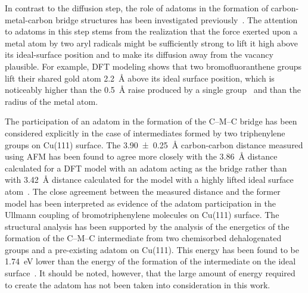 \documentclass[%
 reprint,
 amsmath,amssymb,
 aps,
prb,
floatfix,
]{revtex4-2}
\newcommand{\lock}{\color{red}}
\newcommand{\lock}{\color{red}}
\newcommand{\comm}{\color{Purple}} %
\begin{document}
{\lock

In contrast to the diffusion step, the role of adatoms in the formation of carbon-metal-carbon bridge structures has been investigated previously~\cite{acsnano2017, acsnano2019}. %
The attention to adatoms in this step stems from the realization that the force exerted upon a metal atom by two aryl radicals might be sufficiently strong to lift it high above its ideal-surface position and to make its diffusion away from the vacancy plausible. 
For example, DFT modeling shows that two bromofluoranthene groups lift their shared gold atom \SI{2.2}{\angstrom} above its ideal surface position, which is noticeably higher than the \SI{0.5}{\angstrom} raise produced by a single group~\cite{jpcc2018} and than the radius of the metal atom.

The participation of an adatom in the formation of the C--M--C bridge has been considered explicitly in the case of intermediates formed by two triphenylene groups on Cu(111) surface. 
The \SI{3.90\pm 0.25}{\angstrom} carbon-carbon distance measured using AFM has been found to agree more closely with the \SI{3.86}{\angstrom} distance calculated for a DFT model with an adatom acting as the bridge rather than with \SI{3.42}{\angstrom} distance calculated for the model with a highly lifted ideal surface atom~\cite{acsnano2017}. 
The close agreement between the measured distance and the former model has been interpreted as evidence of the adatom participation in the Ullmann coupling of bromotriphenylene molecules on Cu(111) surface. 
%
The structural analysis has been supported by the analysis of the energetics of the formation of the C--M--C intermediate from two chemisorbed dehalogenated groups and a pre-existing adatom on Cu(111). This energy has been found to be \SI{1.74}{\electronvolt} lower than the energy of the formation of the intermediate on the ideal surface~\cite{acsnano2017}. It should be noted, however, that the large amount of energy required to create the adatom has not been taken into consideration in this work.

}
\end{document}
